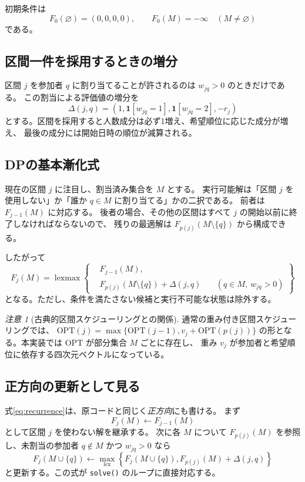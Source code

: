 \documentclass[11pt,a4paper]{ltjsarticle}
\theoremstyle{definition}
\theoremstyle{remark}
\newtheorem{remark}[theorem]{注意}
\newcommand{\ind}[1]{\mathbf{1}\!\left[#1\right]}
\newcommand{\lexmax}{\operatorname{lexmax}}
\newcommand{\code}[1]{\texttt{#1}}
\newcommand{\negInf}{\bm{-\infty}}
\begin{document}
初期条件は
\begin{equation}
 F_0(\varnothing)=(0,0,0,0),\qquad
 F_0(M)=\negInf\quad(M\ne\varnothing)
 \label{eq:initial}
\end{equation}
である。

\subsection{区間一件を採用するときの増分}
区間 $j$ を参加者 $q$ に割り当てることが許されるのは $w_{jq}>0$ のときだけである。
この割当による評価値の増分を
\begin{equation}
 \Delta(j,q)=\left(
 1,\ind{w_{jq}=1},\ind{w_{jq}=2},-r_j
 \right)
 \label{eq:delta}
\end{equation}
とする。区間を採用すると人数成分は必ず1増え、希望順位に応じた成分が増え、
最後の成分には開始日時の順位が減算される。

\subsection{DPの基本漸化式}
現在の区間 $j$ に注目し、割当済み集合を $M$ とする。
実行可能解は「区間 $j$ を使用しない」か「誰か $q\in M$ に割り当てる」かの二択である。
前者は $F_{j-1}(M)$ に対応する。
後者の場合、その他の区間はすべて $j$ の開始以前に終了しなければならないので、
残りの最適解は $F_{p(j)}(M\setminus\{q\})$ から構成できる。

したがって
\begin{equation}
 \boxed{
 F_j(M)=\lexmax\left\{
 \begin{aligned}
  &F_{j-1}(M),\\[-1pt]
  &F_{p(j)}(M\setminus\{q\})+\Delta(j,q)
  &&\ (q\in M,\ w_{jq}>0)
 \end{aligned}\right\}}
 \label{eq:recurrence}
\end{equation}
となる。ただし、条件を満たさない候補と実行不可能な状態は除外する。

\begin{remark}[古典的区間スケジューリングとの関係]
通常の重み付き区間スケジューリングでは、
$\mathrm{OPT}(j)=\max\{\mathrm{OPT}(j-1),v_j+\mathrm{OPT}(p(j))\}$
の形となる。本実装では $\mathrm{OPT}$ が部分集合 $M$ ごとに存在し、
重み $v_j$ が参加者と希望順位に依存する四次元ベクトルになっている。
\end{remark}

\subsection{正方向の更新として見る}
式\eqref{eq:recurrence}は、原コードと同じく\emph{正方向}にも書ける。
まず
\[
 F_j(M)\gets F_{j-1}(M)
\]
として区間 $j$ を使わない解を継承する。
次に各 $M$ について $F_{p(j)}(M)$ を参照し、未割当の参加者 $q\notin M$ かつ $w_{jq}>0$ なら
\begin{equation}
 F_j(M\cup\{q\})\gets
 \max_{\mathrm{lex}}\left\{
 F_j(M\cup\{q\}), F_{p(j)}(M)+\Delta(j,q)
 \right\}
 \label{eq:forward}
\end{equation}
と更新する。この式が \code{solve()} のループに直接対応する。
\end{document}
